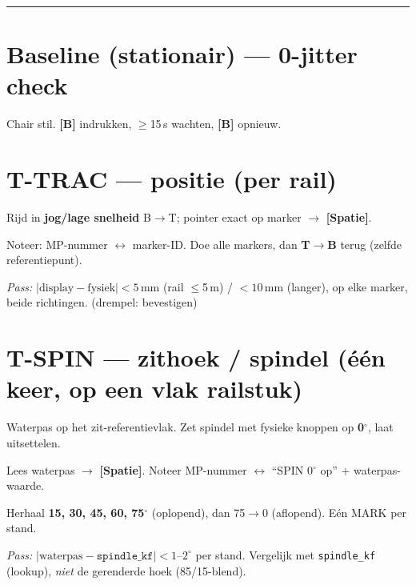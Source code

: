 \documentclass[10pt,a4paper]{article}
\newcommand{\btn}[1]{\textbf{[#1]}}
\newcommand{\pass}[1]{\textit{Pass:} #1}
\begin{document}
\hrule\vspace{4pt}

\section{Baseline (stationair) — 0-jitter check}
\begin{cb}
\item Chair stil. \btn{B} indrukken, $\geq$15\,s wachten, \btn{B} opnieuw.
\end{cb}

\section{T-TRAC — positie (per rail)}
\begin{cb}
\item Rijd in \textbf{jog/lage snelheid} B$\rightarrow$T; pointer exact op marker $\rightarrow$ \btn{Spatie}.
\item Noteer: MP-nummer $\leftrightarrow$ marker-ID. Doe alle markers, dan \textbf{T$\rightarrow$B} terug (zelfde referentiepunt).
\end{cb}
\pass{$|\text{display} - \text{fysiek}| < 5$\,mm (rail $\leq$5\,m) / $<10$\,mm (langer), op elke marker, beide richtingen. \footnotesize(drempel: bevestigen)}

\section{T-SPIN — zithoek / spindel (één keer, op een vlak railstuk)}
\begin{cb}
\item Waterpas op het zit-referentievlak. Zet spindel met fysieke knoppen op \textbf{0$^\circ$}, laat uitsettelen.
\item Lees waterpas $\rightarrow$ \btn{Spatie}. Noteer MP-nummer $\leftrightarrow$ ``SPIN 0$^\circ$ op'' + waterpas-waarde.
\item Herhaal \textbf{15, 30, 45, 60, 75$^\circ$} (oplopend), dan 75$\rightarrow$0 (aflopend). Eén MARK per stand.
\end{cb}
\pass{$|\text{waterpas} - \texttt{spindle\_kf}| < 1$--$2^\circ$ per stand. \footnotesize Vergelijk met \texttt{spindle\_kf} (lookup), \emph{niet} de gerenderde hoek (85/15-blend).}
\end{document}
